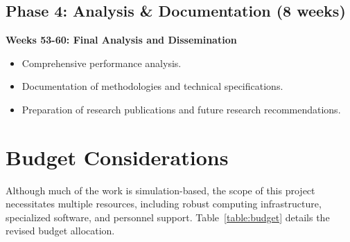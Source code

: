 \documentclass[conference]{IEEEtran}
\begin{document}
\subsection*{Phase 4: Analysis \& Documentation (8 weeks)}
\textbf{Weeks 53-60: Final Analysis and Dissemination}
\begin{itemize}
    \item Comprehensive performance analysis.
    \item Documentation of methodologies and technical specifications.
    \item Preparation of research publications and future research recommendations.
\end{itemize}

\section{Budget Considerations}
Although much of the work is simulation-based, the scope of this project necessitates multiple resources, including robust computing infrastructure, specialized software, and personnel support. Table~\ref{table:budget} details the revised budget allocation.
\end{document}
